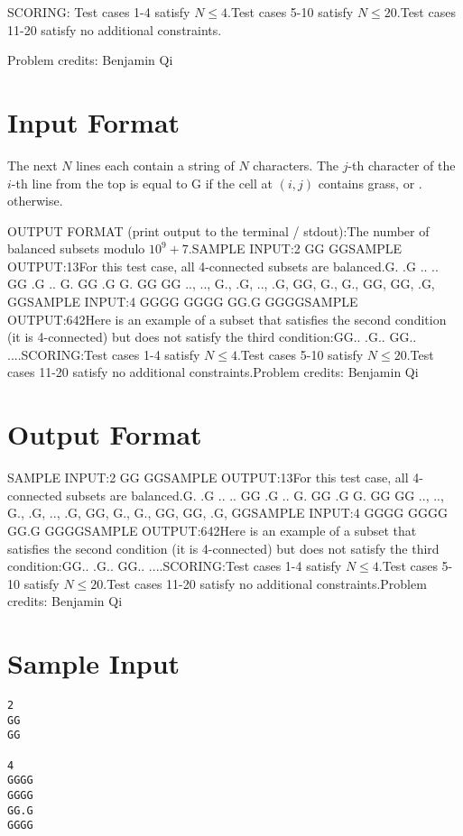 \documentclass[12pt]{article}
\begin{document}
SCORING:
Test cases 1-4 satisfy $N\le 4$.Test cases 5-10 satisfy $N\le 20$.Test cases 11-20 satisfy no additional constraints.


Problem credits: Benjamin Qi



\section*{Input Format}
The next $N$ lines each contain a string of $N$ characters. The $j$-th character
of the $i$-th line from the top is equal to G if the cell at $(i,j)$ contains
grass, or . otherwise.

OUTPUT FORMAT (print output to the terminal / stdout):The number of balanced subsets modulo $10^9+7$.SAMPLE INPUT:2
GG
GGSAMPLE OUTPUT:13For this test case, all 4-connected subsets are balanced.G.  .G  ..  ..  GG  .G  ..  G.  GG  .G  G.  GG  GG
.., .., G., .G, .., .G, GG, G., G., GG, GG, .G, GGSAMPLE INPUT:4
GGGG
GGGG
GG.G
GGGGSAMPLE OUTPUT:642Here is an example of a subset that satisfies the second condition (it is
4-connected) but does not satisfy the third condition:GG..
.G..
GG..
....SCORING:Test cases 1-4 satisfy $N\le 4$.Test cases 5-10 satisfy $N\le 20$.Test cases 11-20 satisfy no additional constraints.Problem credits: Benjamin Qi

\section*{Output Format}
SAMPLE INPUT:2
GG
GGSAMPLE OUTPUT:13For this test case, all 4-connected subsets are balanced.G.  .G  ..  ..  GG  .G  ..  G.  GG  .G  G.  GG  GG
.., .., G., .G, .., .G, GG, G., G., GG, GG, .G, GGSAMPLE INPUT:4
GGGG
GGGG
GG.G
GGGGSAMPLE OUTPUT:642Here is an example of a subset that satisfies the second condition (it is
4-connected) but does not satisfy the third condition:GG..
.G..
GG..
....SCORING:Test cases 1-4 satisfy $N\le 4$.Test cases 5-10 satisfy $N\le 20$.Test cases 11-20 satisfy no additional constraints.Problem credits: Benjamin Qi

\section*{Sample Input}
\begin{verbatim}
2
GG
GG

4
GGGG
GGGG
GG.G
GGGG
\end{verbatim}
\end{document}
